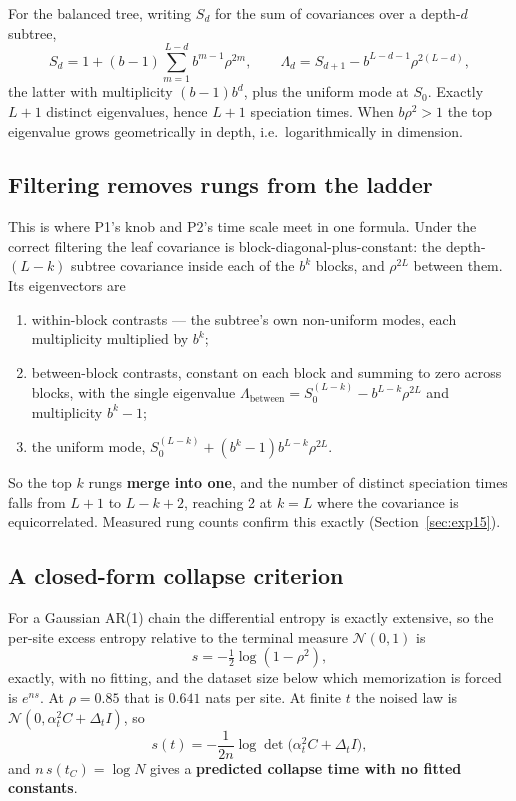 \documentclass[11pt]{article}
\theoremstyle{remark}
\begin{document}
For the balanced tree, writing $S_d$ for the sum of covariances over a depth-$d$
subtree,
\begin{equation}
  S_d = 1 + (b-1)\sum_{m=1}^{L-d} b^{m-1}\rho^{2m},
  \qquad
  \Lambda_d = S_{d+1} - b^{L-d-1}\rho^{2(L-d)},
\end{equation}
the latter with multiplicity $(b-1)b^{d}$, plus the uniform mode at $S_0$.
Exactly $L+1$ distinct eigenvalues, hence $L+1$ speciation times. When
$b\rho^2>1$ the top eigenvalue grows geometrically in depth, i.e.\
logarithmically in dimension.

\subsection{Filtering removes rungs from the ladder}
\label{sec:ladder-collapse}

This is where P1's knob and P2's time scale meet in one formula. Under the
correct filtering the leaf covariance is block-diagonal-plus-constant: the
depth-$(L-k)$ subtree covariance inside each of the $b^k$ blocks, and
$\rho^{2L}$ between them. Its eigenvectors are
\begin{enumerate}[nosep,label=(\roman*)]
  \item within-block contrasts --- the subtree's own non-uniform modes, each
    multiplicity multiplied by $b^k$;
  \item between-block contrasts, constant on each block and summing to zero
    across blocks, with the single eigenvalue
    $\Lambda_{\text{between}} = S_0^{(L-k)} - b^{L-k}\rho^{2L}$ and multiplicity
    $b^k-1$;
  \item the uniform mode,
    $S_0^{(L-k)} + (b^k-1)b^{L-k}\rho^{2L}$.
\end{enumerate}
So the top $k$ rungs \textbf{merge into one}, and the number of distinct
speciation times falls from $L+1$ to $L-k+2$, reaching 2 at $k=L$ where the
covariance is equicorrelated. Measured rung counts confirm this exactly
(Section~\ref{sec:exp15}).

\subsection{A closed-form collapse criterion}

For a Gaussian AR(1) chain the differential entropy is exactly extensive, so the
per-site excess entropy relative to the terminal measure $\mathcal N(0,1)$ is
\begin{equation}
  s = -\tfrac12\log(1-\rho^2),
\end{equation}
exactly, with no fitting, and the dataset size below which memorization is
forced is $e^{ns}$. At $\rho = 0.85$ that is $0.641$ nats per site. At finite
$t$ the noised law is $\mathcal N(0,\alpha_t^2 C + \Delta_t I)$, so
\begin{equation}
  s(t) = -\frac{1}{2n}\log\det\bigl(\alpha_t^2 C + \Delta_t I\bigr),
\end{equation}
and $n\,s(t_C) = \log N$ gives a \textbf{predicted collapse time with no fitted
constants}.
\end{document}
